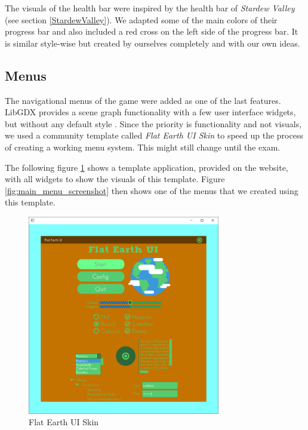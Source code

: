 \documentclass[12p]{article}
\begin{document}
The visuals of the health bar were inspired by the health bar of \emph{Stardew Valley} (see section \ref{StardewValley}). We adapted some of the main colors of their progress bar and also included a red cross on the left side of the progress bar. It is similar style-wise but created by ourselves completely and with our own ideas.


\subsection{Menus} \label{VisualDocMenus}

The navigational menus of the game were added as one of the last features. LibGDX provides a scene graph functionality with a few user interface widgets, but without any default style \cite{Scene2DUI}. Since the priority is functionality and not visuals, we used a community template called \emph{Flat Earth UI Skin} \cite{FlatEarthUISkin} to speed up the process of creating a working menu system. This might still change until the exam.

The following figure \ref{fig:flat_earth_ui_skin} shows a template application, provided on the website, with all widgets to show the visuals of this template. Figure \ref{fig:main_menu_screenshot} then shows one of the menus that we created using this template.

\begin{figure}[ht]
  \center
  \includegraphics[width=0.75\textwidth]{Documentation/preview.png}
  \caption{Flat Earth UI Skin \cite{FlatEarthUISkin}}
  \label{fig:flat_earth_ui_skin}
\end{figure}
\end{document}
